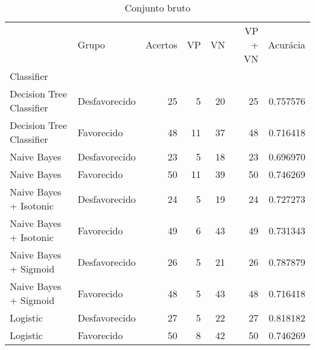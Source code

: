 \begin{table}
\centering
\caption{Conjunto bruto}
\label{Conjunto bruto 3}
\begin{tabular}{llrrrrr}
\toprule
{} &          Grupo &  Acertos &  VP  &  VN  &  VP + VN  &  Acurácia \\
Classifier               &                &          &      &      &           &           \\
\midrule
Decision Tree Classifier &  Desfavorecido &       25 &    5 &   20 &        25 &  0.757576 \\
Decision Tree Classifier &     Favorecido &       48 &   11 &   37 &        48 &  0.716418 \\
Naive Bayes              &  Desfavorecido &       23 &    5 &   18 &        23 &  0.696970 \\
Naive Bayes              &     Favorecido &       50 &   11 &   39 &        50 &  0.746269 \\
Naive Bayes + Isotonic   &  Desfavorecido &       24 &    5 &   19 &        24 &  0.727273 \\
Naive Bayes + Isotonic   &     Favorecido &       49 &    6 &   43 &        49 &  0.731343 \\
Naive Bayes + Sigmoid    &  Desfavorecido &       26 &    5 &   21 &        26 &  0.787879 \\
Naive Bayes + Sigmoid    &     Favorecido &       48 &    5 &   43 &        48 &  0.716418 \\
Logistic                 &  Desfavorecido &       27 &    5 &   22 &        27 &  0.818182 \\
Logistic                 &     Favorecido &       50 &    8 &   42 &        50 &  0.746269 \\
\bottomrule
\end{tabular}
\end{table}

